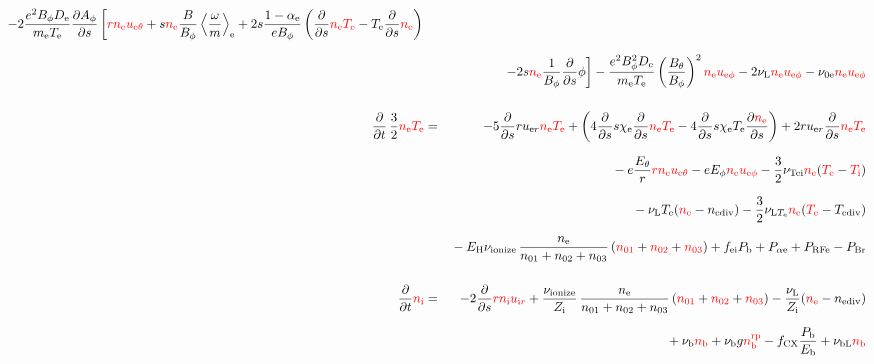 \documentclass[11pt]{article}
\def\r#1{{\rm#1}}
\def\ddt{\frac{\partial}{\partial t}}
\def\dds{\frac{\partial}{\partial s}}
\def\dd#1{\frac{\partial #1}{\partial s}}
\def\ave#1{\left\langle#1\right\rangle}
\def\me{m_\r{e}}
\def\mb{m_\r{b}}
\def\De{D_\r{e}}
\def\Di{D_\r{i}}
\def\chie{\chi_\r{e}}
\def\nee{n_\r{e}}
\def\ni{n_\r{i}}
\def\nb{n_\r{b}}
\def\uer{u_{\r{e}r}}
\def\uir{u_{\r{i}r}}
\def\ueth{u_{\r{e}\theta}}
\def\uith{u_{\r{i}\theta}}
\def\ueph{u_{\r{e}\phi}}
\def\uiph{u_{\r{i}\phi}}
\def\ubph{u_{\r{b}\phi}}
\def\Eth{E_\theta}
\def\Eph{E_\phi}
\def\Bth{B_\theta}
\def\Bph{B_\phi}
\def\Aph{A_\phi}
\def\Te{T_\r{e}}
\def\Ti{T_\r{i}}
\def\nna{n_{01}}
\def\nnb{n_{02}}
\def\nnc{n_{03}}
\def\Zi{Z_\r{i}}
\def\Pb{P_\r{b}}
\def\Eb{E_\r{b}}
\def\PRFe{P_\r{RFe}}
\def\PBr{P_\r{Br}}
\def\EH{E_\r{H}}
\def\fei{f_\r{ei}}
\def\nbrp{n_\r{b}^\r{rp}}
\def\fCX{f_\r{CX}}
\def\Palpe{P_{\alpha\r{e}}}
\def\nube{\nu_\r{be}}
\def\nune{\nu_\r{0e}}
\def\nuL{\nu_\r{L}}
\def\nuion{\nu_\r{ionize}}
\def\nub{\nu_\r{b}}
\def\nuTei{\nu_\r{Tei}}
\def\vb{v_\r{b}}
\def\nediv{n_\r{ediv}}
\def\Tediv{T_\r{ediv}}
\def\nuLTe{\nu_{\r{L}T_\r{e}}}
\def\nubL{\nu_\r{bL}}
\def\red#1{\textcolor{red}{#1}}
\begin{document}
\begin{eqnarray}
%
  - 2\frac{e^2 \Bph \De}{\me\Te}\dd{\Aph}\left[
    \red{r\nee\ueth} + s \red{\nee}\frac{B}{\Bph}\ave{\frac{\omega}{m}}_\r{e}
     + 2 s \frac{1-\alpha_\r{e}}{e\Bph} \left(\dds \red{\nee\Te} - \Te
					 \dds \red{\nee}\right)\right. 
\nonumber\\[2.5mm]&&{}
%
    \left.- 2 s \red{\nee}\frac{1}{\Bph} \dds \phi \right]
    - \frac{e^2 \Bph^2
    \De}{\me\Te}\left(\frac{\Bth}{\Bph}\right)^2\red{\nee}\red{\ueph}
%
%
%
  - 2 \nuL \red{\nee \ueph}
%
  - \nune \red{\nee \ueph}
%
%
\\[5mm]
  \ddt \, \frac{3}{2} \red{\nee \Te} &=&
%
   - 5 \dds r \uer \red{\nee \Te}
%
   + \left(   4 \dds s \chie \dds \red{\nee \Te}
%
            - 4 \dds s \chie \Te \dd{\red{\nee}} \right)
%
  + 2 r \uer \dds \red{\nee \Te}
%
\nonumber\\[2.5mm]&&{}
%
  -  e \frac{\Eth}{r} \red{r \nee \ueth}
%
  -  e \Eph \red{\nee \ueph} 
%
  - \frac{3}{2} \nuTei \red{\nee} (\red{\Te} - \red{\Ti})
%
%
\nonumber\\[2.5mm]&&{}
%
  - \nuL \Te (\red{\nee} - \nediv)
%
  - \frac{3}{2} \nuLTe \red{\nee} (\red{\Te} - \Tediv)
\nonumber\\[2.5mm]&&{}
%
  - \EH \nuion\, \frac{\nee}{\nna + \nnb + \nnc}\, (\red{\nna} + \red{\nnb} + \red{\nnc})
%
  + \fei \Pb
%
  + \Palpe
%
  + \PRFe
%
  - \PBr
\\[5mm]
  \ddt \red{\ni} &=&
%
  - 2 \dds \red{r \ni \uir}
%
  + \frac{\nuion}{\Zi}\, \frac{\nee}{\nna + \nnb + \nnc}\, (\red{\nna} +
  \red{\nnb} + \red{\nnc})
%
  - \frac{\nuL}{\Zi} (\red{\nee} - \nediv) 
\nonumber\\[2.5mm]&&{}
%
  + \nub \red{\nb}
%
  + \nub g \red{\nbrp}
%
  - \fCX \frac{\Pb}{\Eb}
%
  + \nubL \red{\nb}

\end{eqnarray}
\end{document}
